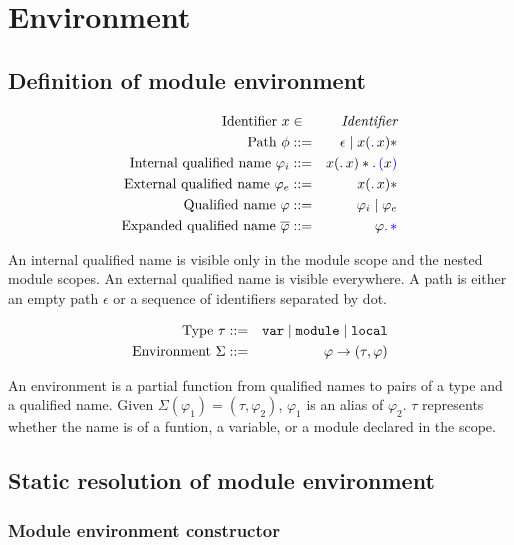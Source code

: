\documentclass[a4paper]{article}
\newcommand{\Identifier}{\emph{Identifier}}
\newcommand{\code}[1]{\textcolor{blue}{\tt #1}}
\newcommand{\mydot}{.\,}
\newcommand{\clparen}{\code{(}}
\newcommand{\crparen}{\code{)}}
\newcommand{\var}{{\tt{var}}}
\newcommand{\module}{{\tt{module}}}
\newcommand{\local}{{\tt{local}}}
\begin{document}
\section{Environment}

\subsection{Definition of module environment}

\begin{eqnarray*}
\mbox{Identifier}\ x & \in & \Identifier \\
\mbox{Path}\ \phi & ::= & \epsilon \mid x(\code{\mydot}x)* \\
\mbox{Internal qualified name}\ \varphi_i & ::= & x(\code{\mydot}x)*\code{\mydot}\clparen x \crparen \\
\mbox{External qualified name}\ \varphi_e & ::= & x(\code{\mydot}x)* \\
\mbox{Qualified name}\ \varphi & ::= & \varphi_i \mid \varphi_e \\
\mbox{Expanded qualified name}\ \overline{\varphi} & ::= & \varphi\code{\mydot*}
\end{eqnarray*}

An internal qualified name is visible only in the module scope and the nested module scopes.
An external qualified name is visible everywhere.
A path is either an empty path $\epsilon$ or a sequence of identifiers separated by dot.

\begin{eqnarray*}
\mbox{Type}\ \tau & ::= & \var \mid \module \mid \local \\
\mbox{Environment}\ \Sigma & ::= & \varphi \rightarrow (\tau, \varphi) \\
\end{eqnarray*}

An environment is a partial function from qualified names to pairs of a type and a qualified name.
Given $\Sigma(\varphi_1) = (\tau, \varphi_2)$, $\varphi_1$ is an alias of $\varphi_2$.
$\tau$ represents whether the name is of a funtion, a variable, or a module declared in the scope.

\subsection{Static resolution of module environment}

\subsubsection{Module environment constructor}
\end{document}
